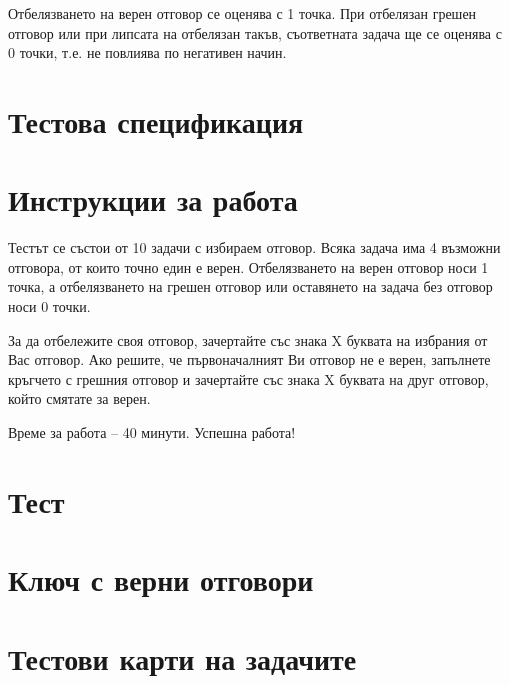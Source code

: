 Отбелязването на верен отговор се оценява с 1 точка. При отбелязан грешен отговор или при липсата на отбелязан такъв, съответната задача ще се оценява с 0 точки, т.е. не повлиява по негативен начин.

\section{Тестова спецификация}

\section{Инструкции за работа}
Тестът се състои от 10 задачи с избираем отговор. Всяка задача има 4 възможни отговора, от които точно един е верен. Отбелязването на верен отговор носи 1 точка, а отбелязването на грешен отговор или оставянето на задача без отговор носи 0 точки.

За да отбележите своя отговор, зачертайте със знака X буквата на избрания от Вас отговор. Ако решите, че първоначалният Ви отговор не е верен, запълнете кръгчето с грешния отговор и зачертайте със знака X буквата на друг отговор, който смятате за верен.

Време за работа – 40 минути.
Успешна работа!

\section{Тест}

\section{Ключ с верни отговори}

\section{Тестови карти на задачите}